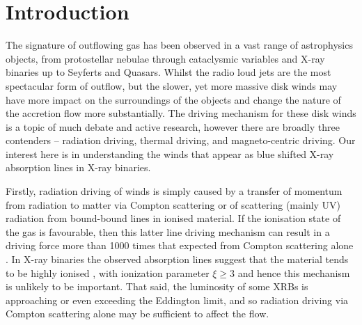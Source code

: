 \documentclass[a4paper,fleqn,usenatbib]{mnras}
\begin{document}
\section{Introduction}
The signature of outflowing gas has been observed in a vast range of astrophysics objects, from protostellar
nebulae through cataclysmic variables and X-ray binaries up to Seyferts and Quasars. Whilst the 
radio loud jets are the most spectacular form of outflow, but the slower, yet more massive disk
winds may have more impact on the surroundings of the objects and change the nature
of the accretion flow more substantially.
The driving mechanism for these disk winds is a topic of much debate and active research, however there are broadly
three contenders -- radiation driving, thermal driving, and magneto-centric driving.  Our interest here is in understanding the winds that appear as blue shifted X-ray absorption lines in X-ray binaries.


Firstly, radiation driving of winds is simply caused by a transfer of momentum from radiation to matter via Compton
scattering or of scattering (mainly UV) radiation
from bound-bound lines in ionised material. If the ionisation state of the gas is 
favourable, then this latter line driving mechanism can
result in a driving force more than  1000 times that expected from Compton scattering alone \citep{1975ApJ...195..157C}.
 In X-ray binaries
the observed absorption lines suggest that the material tends to be highly ionised \citep[e.g.][]{2009ApJ...701..865K,
2018ApJ...861...26A}, with ionization parameter $\xi \geq 3$
\citep{2016AN....337..368D} and hence this mechanism is unlikely to be important. That said, the luminosity of 
some XRBs is 
approaching or even exceeding the Eddington limit, and so radiation driving via Compton scattering alone 
may be sufficient to affect the
flow.
\end{document}
